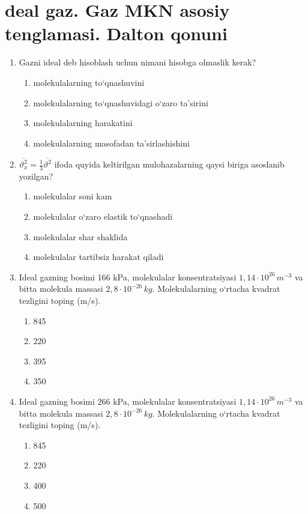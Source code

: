 \section{deal gaz. Gaz MKN asosiy tenglamasi. Dalton qonuni}


\begin{enumerate}

\item Gazni ideal deb hisoblash uchun nimani hisobga olmaslik kerak?
\begin{enumerate}[label=\Alph*)]
\item molekulalarning to‘qnashuvini
\item molekulalarning to‘qnashuvidagi o‘zaro ta’sirini
\item molekulalarning harakatini
\item molekulalarning masofadan ta’sirlashishini
\end{enumerate}

\item $\overline{\vartheta_x^2} = \frac{1}{3} \overline{\vartheta^2}$ ifoda quyida keltirilgan mulohazalarning qaysi biriga asoslanib yozilgan?
\begin{enumerate}[label=\Alph*)]
\item molekulalar soni kam
\item molekulalar o‘zaro elastik to‘qnashadi
\item molekulalar shar shaklida
\item molekulalar tartibsiz harakat qiladi
\end{enumerate}

\item Ideal gazning bosimi 166 kPa, molekulalar konsentratsiyasi $1,14 \cdot 10^{26} \, m^{-3}$ va bitta molekula massasi $2,8 \cdot 10^{-26} \, kg$. Molekulalarning o‘rtacha kvadrat tezligini toping (m/s).
\begin{enumerate}[label=\Alph*)]
\item 845
\item 220
\item 395
\item 350
\end{enumerate}

\item Ideal gazning bosimi 266 kPa, molekulalar konsentratsiyasi $1,14 \cdot 10^{26} \, m^{-3}$ va bitta molekula massasi $2,8 \cdot 10^{-26} \, kg$. Molekulalarning o‘rtacha kvadrat tezligini toping (m/s).
\begin{enumerate}[label=\Alph*)]
\item 845
\item 220
\item 400
\item 500
\end{enumerate}


\end{enumerate}
